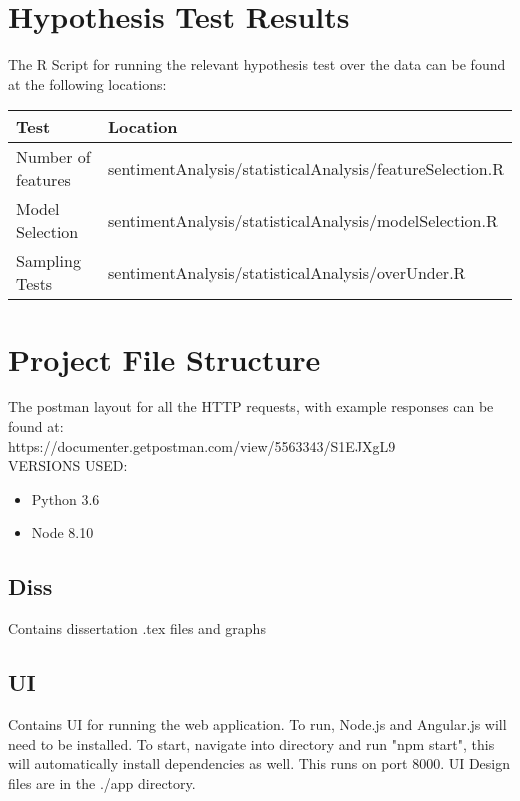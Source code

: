 
\begin{appendices}

\section{Hypothesis Test Results}
\label{appendix:hypothesis}
The R Script for running the relevant hypothesis test over the data can be found at the following locations:
\begin{center}

\begin{tabular}{|l|l|}
\hline
 Test &  Location\\ \hline
 Number of features &  sentimentAnalysis/statisticalAnalysis/featureSelection.R\\
 Model Selection &  sentimentAnalysis/statisticalAnalysis/modelSelection.R\\
 Sampling Tests &  sentimentAnalysis/statisticalAnalysis/overUnder.R\\ \hline
\end{tabular}
\end{center}

\section{Project File Structure}

The postman layout for all the HTTP requests, with example responses can be found at:
\\ https://documenter.getpostman.com/view/5563343/S1EJXgL9
\\ 
VERSIONS USED: 
\begin{itemize}
    \item Python 3.6
    \item Node  8.10
\end{itemize}

\subsection{Diss}
Contains dissertation .tex files and graphs

\subsection{UI}
Contains UI for running the web application.  To run, Node.js and Angular.js will need to be installed.
To start, navigate into directory and run "npm start", this will automatically install dependencies as well.
This runs on port 8000.
UI Design files are in the ./app directory.


\end{appendices}
